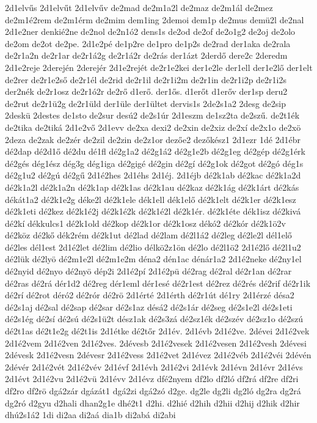 {2d1elvűs
2d1elvűt
2d1elvűv
de2mad
de2m1a2l
de2maz
de2m1ál
de2mez
de2m1é2rem
de2m1érm
de2mim
dem1ing
2demoi
dem1p
de2mus
demü2l
de2nal
2d1e2ner
denkié2ne
de2nol
de2n1ó2
dens1s
de2od
de2of
de2o1g2
de2oj
de2olo
de2om
de2ot
de2pe.
2d1e2pé
de1p2re
de1pro
de1p2s
de2rad
der1aka
de2rala
de2r1a2n
de2r1ar
de2r1á2g
de2r1á2r
de2rás
der1ázt
2derdő
dere2c
2deredm
2d1e2reje
2derején
2derejér
2d1e2rejét
de2r1e2kei
der1e2le
der1ell
der1e2lő
der1elt
de2rer
de2r1e2ső
de2r1él
de2rid
de2r1il
de2r1i2m
de2r1in
de2r1i2p
de2r1i2s
der2nék
de2r1osz
de2r1ó2r
de2rő
d1erő.
der1ős.
d1erőt
d1erőv
der1sp
deru2
de2rut
de2r1ü2g
de2r1üld
der1üle
der1ültet
dervis1s
2de2s1a2
2desg
de2sip
2deskü
2destes
de1sto
de2sur
desú2
de2s1úr
2d1eszm
de1sz2ta
de2szű.
de2t1ék
de2tika
de2tiká
2d1e2vő
2d1evv
de2xa
dexi2
de2xin
de2xiz
de2xí
de2x1o
de2xö
2deza
de2zak
de2zér
de2zil
de2zin
de2z1or
dezőe2
dezőkész1
2d1ezr
1dé
2d1ébr
dé2dap
dé2d1ő
dé2du
dé1fl
dé2g1a2
dé2g1á2
dé2g1e2b
dé2g1eg
dé2gép
dé2g1érk
dé2gés
dég1ész
dég3g
dég1iga
dé2gigé
dé2gin
dé2gí
dé2g1ok
dé2got
dé2gó
dég1s
dé2g1u2
dé2gú
dé2gű
2d1é2hes
2d1éhs
2d1éj.
2d1éjb
dé2k1ab
dé2kac
dé2k1a2d
dé2k1a2l
dé2k1a2n
dé2k1ap
dé2k1as
dé2k1au
dé2kaz
dé2k1ág
dé2k1árt
dé2kás
dékát1a2
dé2k1e2g
déke2l
dé2k1ele
dék1ell
dék1elő
dé2k1elt
dé2k1er
dé2k1esz
dé2k1eti
dé2kez
dé2k1é2j
dé2k1é2k
dé2k1é2l
dé2k1ér.
dé2k1éte
dék1isz
dé2kivá
dé2kí
dékkulcs1
dé2k1old
dé2kop
dé2k1or
dé2k1osz
dékó2
dé2kór
dé2k1ö2v
dé2köz
dé2kő
dék2rém
dé2k1ut
dé2lad
dé2lam
dé2l1á2
dé2leg
dé2le2l
dél1elő
dé2les
dél1est
2d1é2let
dé2lim
dé2lio
délkö2z1ön
dé2lo
dé2l1ö2
2d1é2lő
dé2l1u2
dé2lük
dé2lyö
dé2m1e2l
dé2m1e2m
déna2
dén1ac
dénár1a2
2d1é2neke
dé2ny1el
dé2nyid
dé2nyo
dé2nyö
dép2i
2d1é2pí
2d1é2pü
dé2rag
dé2ral
dé2r1an
dé2rar
dé2ras
dé2rá
dér1d2
dé2reg
dér1eml
dér1esé
dé2r1est
dé2rez
dé2rés
dé2rif
dé2r1ik
dé2rí
dé2rot
déró2
dé2rór
dé2rö
2d1érté
2d1érth
dé2r1út
dé1ry
2d1érzé
désa2
dé2s1aj
dé2sal
dé2sap
dé2sar
dé2s1az
désá2
dé2s1ár
dé2seg
dé2s1e2l
dé2s1eti
dé2s1ég
dé2sí
dé2sú
dé2s1ü2t
dész1ak
dé2s3zá
dé2sz1ék
dé2szév
dé2sz1o
dé2szú
dé2t1as
dé2t1e2g
dé2t1is
2d1étke
dé2tőr
2d1év.
2d1évb
2d1é2ve.
2dévei
2d1é2vek
2d1é2vem
2d1é2ven
2d1é2ves.
2dévesb
2d1é2vesek
2d1é2vesen
2d1é2vesh
2dévesi
2dévesk
2d1é2vesn
2dévesr
2d1é2vess
2d1é2vet
2d1évez
2d1é2véb
2d1é2véi
2dévén
2dévér
2d1é2vét
2d1é2vév
2d1évf
2d1évh
2d1é2vi
2d1évk
2d1évn
2d1évr
2d1évs
2d1évt
2d1é2vu
2d1é2vü
2d1évv
2d1évz
dfé2nyem
df2lo
df2ló
df2rá
df2re
df2ri
df2ro
df2rö
dgá2zár
dgázát1
dgá2zi
dgá2zó
d2ge.
dg2le
dg2li
dg2ló
dg2ra
dg2rá
dg2ró
d2gyu
d2hali
dhan2g1e
dhé2t1
d2hi.
d2hié
d2hih
d2hii
d2hij
d2hik
d2hir
dhú2s1á2
1di
di2aa
di2aá
dia1b
di2abá
di2abi
}
